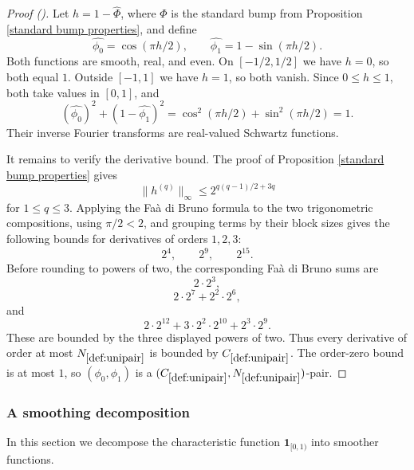 \documentclass[12pt,reqno]{amsart}
\newcommand{\auto}{{({\tiny\faCar})}}
\theoremstyle{plain}
\numberwithin{equation}{section}
\theoremstyle{remark}
\begin{document}
\begin{proof}[Proof \auto]
Let $h=1-\widehat\Phi$, where $\Phi$ is the standard bump from Proposition \ref{standard bump properties}, and define
\[
\widehat{\phi_0}=\cos(\pi h/2),
\qquad
\widehat{\phi_1}=1-\sin(\pi h/2).
\]
Both functions are smooth, real, and even. On $[-1/2,1/2]$ we have $h=0$, so both equal $1$. Outside $[-1,1]$ we have $h=1$, so both vanish. Since $0\le h\le1$, both take values in $[0,1]$, and
\[
(\widehat{\phi_0})^2+(1-\widehat{\phi_1})^2
=\cos^2(\pi h/2)+\sin^2(\pi h/2)=1.
\]
Their inverse Fourier transforms are real-valued Schwartz functions.

It remains to verify the derivative bound. The proof of Proposition \ref{standard bump properties} gives
\[
\|h^{(q)}\|_\infty
\le2^{q(q-1)/2+3q}
\]
for $1\le q\le3$. Applying the Fa\`a di Bruno formula to the two trigonometric compositions, using $\pi/2<2$, and grouping terms by their block sizes gives the following bounds for derivatives of orders $1,2,3$:
\[
2^4,
\qquad
2^9,
\qquad
2^{15}.
\]
Before rounding to powers of two, the corresponding Fa\`a di Bruno sums are
\[
2\cdot2^3,
\]
\[
2\cdot2^7+2^2\cdot2^6,
\]
and
\[
2\cdot2^{12}+3\cdot2^2\cdot2^{10}+2^3\cdot2^9.
\]
These are bounded by the three displayed powers of two. Thus every derivative of order at most $N_{\ref{def:unipair}}$ is bounded by $C_{\ref{def:unipair}}$. The order-zero bound is at most $1$, so $(\phi_0,\phi_1)$ is a $(C_{\ref{def:unipair}},N_{\ref{def:unipair}})$-pair.
\end{proof}


\subsubsection{A smoothing decomposition}
In this section we  decompose the characteristic function $\mathbf{1}_{[0,1)}$ into smoother functions.
\end{document}
